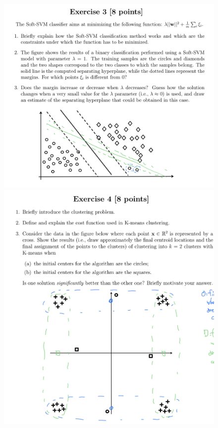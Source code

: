 \documentclass[a4paper,11pt,oneside]{book}
\begin{document}
\begin{figure}[H]
    \centering
    \begin{minipage}{0.45\textwidth}
        \includegraphics[width=\textwidth,page=8]{images/ex3_7_Feb_2020.png}
    \end{minipage}
    \hfill
    \begin{minipage}{0.45\textwidth}
        \includegraphics[width=\textwidth,page=11]{images/ex4_7_Feb_2020.png}
    \end{minipage}
\end{figure}
\end{document}

